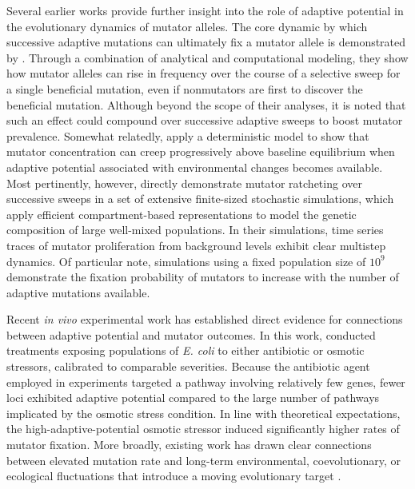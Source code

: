 Several earlier works provide further insight into the role of adaptive potential in the evolutionary dynamics of mutator alleles.
The core dynamic by which successive adaptive mutations can ultimately fix a mutator allele is demonstrated by \citet{tanaka2003evolution}.
Through a combination of analytical and computational modeling, they show how mutator alleles can rise in frequency over the course of a selective sweep for a single beneficial mutation, even if nonmutators are first to discover the beneficial mutation.
Although beyond the scope of their analyses, it is noted that such an effect could compound over successive adaptive sweeps to boost mutator prevalence.
Somewhat relatedly, \citet{travis2002mutator} apply a deterministic model to show that mutator concentration can creep progressively above baseline equilibrium when adaptive potential associated with environmental changes becomes available.
Most pertinently, however, \citet{tenaillon1999mutators} directly demonstrate mutator ratcheting over successive sweeps in a set of extensive finite-sized stochastic simulations, which apply efficient compartment-based representations to model the genetic composition of large well-mixed populations.
In their simulations, time series traces of mutator proliferation from background levels exhibit clear multistep dynamics.
Of particular note, simulations using a fixed population size of $10^9$ demonstrate the fixation probability of mutators to increase with the number of adaptive mutations available.

Recent \textit{in vivo} experimental work has established direct evidence for connections between adaptive potential and mutator outcomes.
In this work, \citet{callens2023hypermutator} conducted treatments exposing populations of \textit{E. coli} to either antibiotic or osmotic stressors, calibrated to comparable severities.
Because the antibiotic agent employed in experiments targeted a pathway involving relatively few genes, fewer loci exhibited adaptive potential compared to the large number of pathways implicated by the osmotic stress condition.
In line with theoretical expectations, the high-adaptive-potential osmotic stressor induced significantly higher rates of mutator fixation.
More broadly, existing work has drawn clear connections between elevated mutation rate and long-term environmental, coevolutionary, or ecological fluctuations that introduce a moving evolutionary target \citep{leigh1970natural,travis2002mutator,travis2004mutators,rosenbloom2014frequencydependent,pal2007coevolution,wei2022rapid}.

